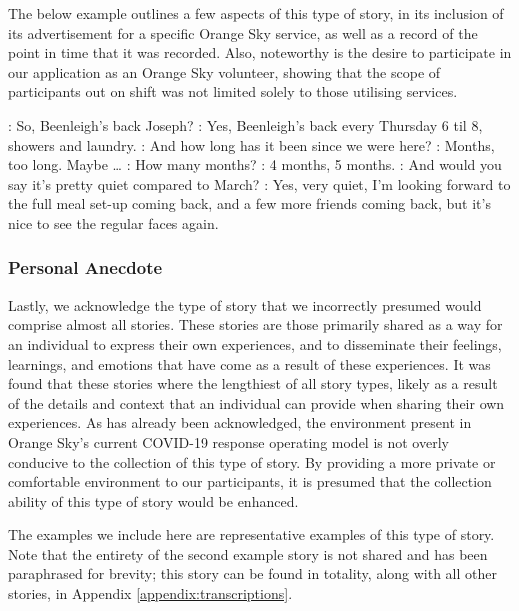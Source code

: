 The below example outlines a few aspects of this type of story, in its inclusion of its advertisement for a specific Orange Sky service, as well as a record of the point in time that it was recorded. Also, noteworthy is the desire to participate in our application as an Orange Sky volunteer, showing that the scope of participants out on shift was not limited solely to those utilising services.

\begin{drama}

    \volaspeaks: So, Beenleigh's back Joseph?
    \volbspeaks: Yes, Beenleigh's back every Thursday 6 til 8, showers and laundry.
    \volaspeaks: And how long has it been since we were here?
    \volbspeaks: Months, too long. Maybe \dots
    \volaspeaks: How many months?
    \volbspeaks: 4 months, 5 months.
    \volaspeaks: And would you say it's pretty quiet compared to March?
    \volbspeaks: Yes, very quiet, I'm looking forward to the full meal set-up coming back, and a few more friends coming back, but it's nice to see the regular faces again.
\end{drama}

\subsubsection{Personal Anecdote}

Lastly, we acknowledge the type of story that we incorrectly presumed would comprise almost all stories. These stories are those primarily shared as a way for an individual to express their own experiences, and to disseminate their feelings, learnings, and emotions that have come as a result of these experiences. It was found that these stories where the lengthiest of all story types, likely as a result of the details and context that an individual can provide when sharing their own experiences. As has already been acknowledged, the environment present in Orange Sky's current COVID-19 response operating model is not overly conducive to the collection of this type of story. By providing a more private or comfortable environment to our participants, it is presumed that the collection ability of this type of story would be enhanced.

The examples we include here are representative examples of this type of story. Note that the entirety of the second example story is not shared and has been paraphrased for brevity; this story can be found in totality, along with all other stories, in Appendix \ref{appendix:transcriptions}.

